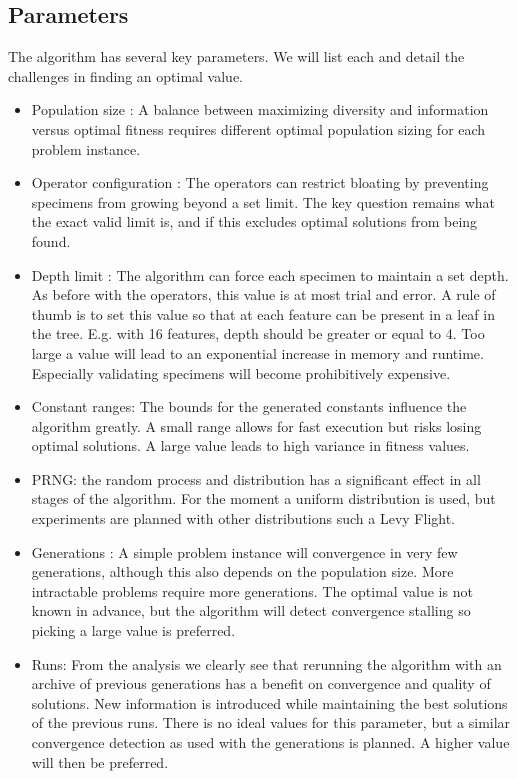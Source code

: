 \documentclass[10pt]{extarticle}
\begin{document}
\subsection{Parameters}
The algorithm has several key parameters. We will list each and detail the challenges in finding an optimal value.
\begin{itemize}
\item Population size : A balance between maximizing diversity and information versus optimal fitness requires different optimal population sizing for each problem instance. 
\item Operator configuration : The operators can restrict bloating by preventing specimens from growing beyond a set limit. The key question remains what the exact valid limit is, and if this excludes optimal solutions from being found.
\item Depth limit : The algorithm can force each specimen to maintain a set depth. As before with the operators, this value is at most trial and error. A rule of thumb is to set this value so that at each feature can be present in a leaf in the tree. E.g. with 16 features, depth should be greater or equal to 4. Too large a value will lead to an exponential increase in memory and runtime. Especially validating specimens will become prohibitively expensive.
\item Constant ranges: The bounds for the generated constants influence the algorithm greatly. A small range allows for fast execution but risks losing optimal solutions. A large value leads to high variance in fitness values. 
\item PRNG: the random process and distribution has a significant effect in all stages of the algorithm. For the moment a uniform distribution is used, but experiments are planned with other distributions such a Levy Flight.
\item Generations : A simple problem instance will convergence in very few generations, although this also depends on the population size. More intractable problems require more generations. The optimal value is not known in advance, but the algorithm will detect convergence stalling so picking a large value is preferred.
\item Runs: From the analysis we clearly see that rerunning the algorithm with an archive of previous generations has a benefit on convergence and quality of solutions. New information is introduced while maintaining the best solutions of the previous runs. There is no ideal values for this parameter, but a similar convergence detection as used with the generations is planned. A higher value will then be preferred.
\end{itemize}
\end{document}
